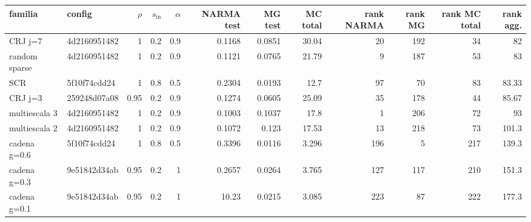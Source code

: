 \begin{tabular}{llrrrrrrrrrr}
\toprule
familia & config & $\rho$ & $s_{\mathrm{in}}$ & $\alpha$ & NARMA test & MG test & MC total & rank NARMA & rank MG & rank MC total & rank agg. \\
\midrule
CRJ j=7 & 4d2160951482 & 1 & 0.2 & 0.9 & 0.1168 & 0.0851 & 30.04 & 20 & 192 & 34 & 82 \\
random sparse & 4d2160951482 & 1 & 0.2 & 0.9 & 0.1121 & 0.0765 & 21.79 & 9 & 187 & 53 & 83 \\
SCR & 5f10f74cdd24 & 1 & 0.8 & 0.5 & 0.2304 & 0.0193 & 12.7 & 97 & 70 & 83 & 83.33 \\
CRJ j=3 & 259248d07a08 & 0.95 & 0.2 & 0.9 & 0.1274 & 0.0605 & 25.09 & 35 & 178 & 44 & 85.67 \\
multiescala 3 & 4d2160951482 & 1 & 0.2 & 0.9 & 0.1003 & 0.1037 & 17.8 & 1 & 206 & 72 & 93 \\
multiescala 2 & 4d2160951482 & 1 & 0.2 & 0.9 & 0.1072 & 0.123 & 17.53 & 13 & 218 & 73 & 101.3 \\
cadena g=0.6 & 5f10f74cdd24 & 1 & 0.8 & 0.5 & 0.3396 & 0.0116 & 3.296 & 196 & 5 & 217 & 139.3 \\
cadena g=0.3 & 9e51842d34ab & 0.95 & 0.2 & 1 & 0.2657 & 0.0264 & 3.765 & 127 & 117 & 210 & 151.3 \\
cadena g=0.1 & 9e51842d34ab & 0.95 & 0.2 & 1 & 10.23 & 0.0215 & 3.085 & 223 & 87 & 222 & 177.3 \\
\bottomrule
\end{tabular}
